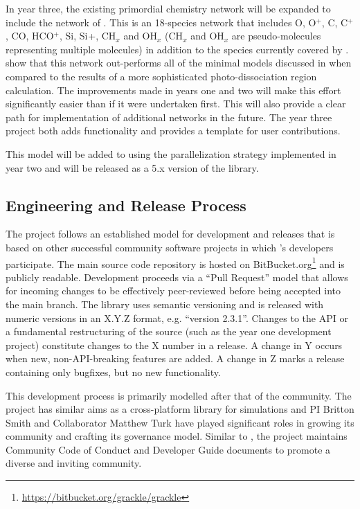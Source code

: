 In year three, the existing primordial chemistry network will be
expanded to include the network of \citet{2016arXiv161009023G}.  This
is an 18-species network that includes O, O$^{+}$, C, C$^{+}$, CO,
HCO$^{+}$, Si, Si$^{}$+, CH$_{x}$ and OH$_{x}$ (CH$_{x}$ and OH$_{x}$
are pseudo-molecules representing multiple molecules) in addition to
the species currently covered by \grackle{}.
\citet{2017ApJ...843...38G} show that this network out-performs all of
the minimal models discussed in \citep{2012MNRAS.421..116G} when
compared to the results of a more sophisticated photo-dissociation
region calculation.  The improvements made in years one and two will
make this effort significantly easier than if it were undertaken
first.  This will also provide a clear path for implementation of
additional networks in the future.  The year three project both adds
functionality and provides a template for user contributions.

This model will be added to \grackle{} using the parallelization
strategy implemented in year two and will be released as a 5.x version
of the \grackle{} library.

\subsection{Engineering and Release Process}

The \grackle{} project follows an established model for development
and releases that is based on other successful community software
projects in which \grackle{}'s developers participate.  The main
source code repository is hosted on
BitBucket.org\footnote{\url{https://bitbucket.org/grackle/grackle}}
and is publicly readable.  Development proceeds via a ``Pull Request''
model that allows for incoming changes to be effectively peer-reviewed
before  being accepted into the main branch.  The \grackle{} library
uses semantic versioning and
is released with numeric versions in an X.Y.Z format, e.g. ``version
2.3.1''.  Changes to the \grackle{} API or a fundamental restructuring
of the source (such as the year one development project) constitute
changes to the X number in a release.  A change in Y occurs when new,
non-API-breaking features are added.  A change in Z marks a release
containing only bugfixes, but no new functionality.

This development process is primarily modelled after that
of the \yt{} community.  The \yt{} project has similar
aims as a cross-platform library for simulations and PI Britton Smith
and Collaborator Matthew Turk have played significant roles in growing
its community and crafting its governance model.  Similar to
\yt{}, the \grackle{} project maintains Community Code of
Conduct and Developer Guide documents to promote a diverse and
inviting community.

